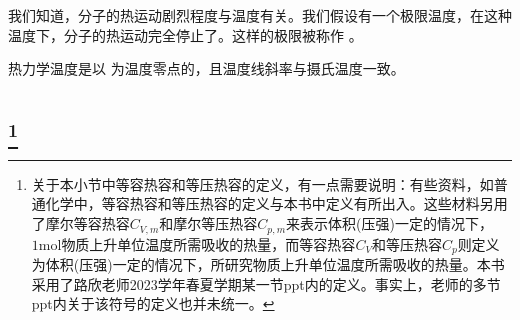 			我们知道，分子的热运动剧烈程度与温度有关。我们假设有一个极限温度，在这种温度下，分子的热运动完全停止了。这样的极限被称作 。
			
            热力学温度是以  为温度零点的，且温度线斜率与摄氏温度一致。
    \section[热力学第一定律]{}
        \subsection[热与功]{\footnote{关于本小节中等容热容和等压热容的定义，有一点需要说明：有些资料，如普通化学中，等容热容和等压热容的定义与本书中定义有所出入。这些材料另用了摩尔等容热容$C_{V,m}$和摩尔等压热容$C_{p,m}$来表示体积(压强)一定的情况下，$1\mathrm{mol}$物质上升单位温度所需吸收的热量，而等容热容$C_V$和等压热容$C_p$则定义为体积(压强)一定的情况下，所研究物质上升单位温度所需吸收的热量。本书采用了路欣老师2023学年春夏学期某一节ppt内的定义。事实上，老师的多节ppt内关于该符号的定义也并未统一。}}
